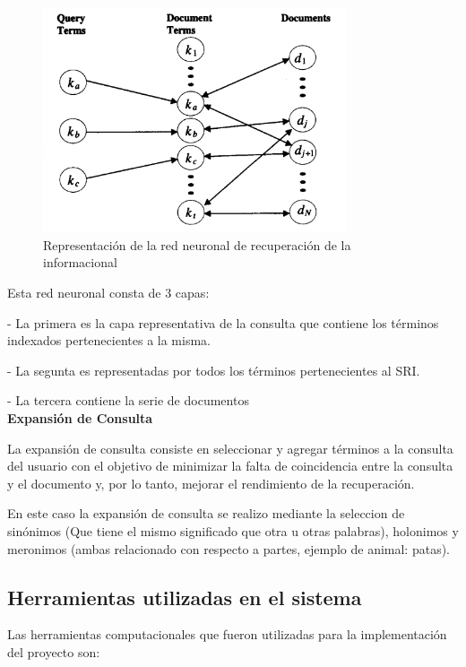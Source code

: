 \documentclass[runningheads]{llncs}
\begin{document}
\begin{figure}[htb]
\centering
\includegraphics[width=0.8\textwidth]{red.png}
\caption{Representación de la red neuronal de recuperación de la informacional}
\label{fig:tigre}
\end{figure} 

Esta red neuronal consta de 3 capas:

-	La primera es la capa representativa de la consulta que contiene los términos indexados pertenecientes a la misma.

-	La segunta es representadas por todos los términos  pertenecientes al SRI.

-	La tercera contiene la serie de documentos \\


\textbf{Expansión de Consulta}

La expansión de consulta consiste en seleccionar y agregar términos a la consulta del usuario con el objetivo de minimizar la falta de coincidencia entre la consulta y el documento y, por lo tanto, mejorar el rendimiento de la recuperación.

En este caso la expansión de consulta se realizo mediante la seleccion de sinónimos (Que tiene el mismo significado que otra u otras palabras), holonimos y meronimos (ambas relacionado con respecto a partes, ejemplo de animal: patas).

\subsection*{Herramientas utilizadas en el sistema}

Las herramientas computacionales que fueron utilizadas para la implementación del proyecto son:\\
\end{document}

